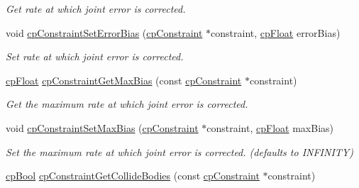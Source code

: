 \begin{DoxyCompactItemize}
\begin{DoxyCompactList}\small\item\em Get rate at which joint error is corrected. \end{DoxyCompactList}\item 
void \hyperlink{group__cp_constraint_ga0cc61db3a9c8d7d5b5b86cfb291f8e4a}{cp\+Constraint\+Set\+Error\+Bias} (\hyperlink{structcp_constraint}{cp\+Constraint} $\ast$constraint, \hyperlink{group__basic_types_gac1ed65573e035bf892505768c852d8d3}{cp\+Float} error\+Bias)
\begin{DoxyCompactList}\small\item\em Set rate at which joint error is corrected. \end{DoxyCompactList}\item 
\hypertarget{group__cp_constraint_ga59463cb910c59fb04102107795ca8c01}{}\hyperlink{group__basic_types_gac1ed65573e035bf892505768c852d8d3}{cp\+Float} \hyperlink{group__cp_constraint_ga59463cb910c59fb04102107795ca8c01}{cp\+Constraint\+Get\+Max\+Bias} (const \hyperlink{structcp_constraint}{cp\+Constraint} $\ast$constraint)\label{group__cp_constraint_ga59463cb910c59fb04102107795ca8c01}

\begin{DoxyCompactList}\small\item\em Get the maximum rate at which joint error is corrected. \end{DoxyCompactList}\item 
\hypertarget{group__cp_constraint_ga32234cacff6f51d15b34ac418f196066}{}void \hyperlink{group__cp_constraint_ga32234cacff6f51d15b34ac418f196066}{cp\+Constraint\+Set\+Max\+Bias} (\hyperlink{structcp_constraint}{cp\+Constraint} $\ast$constraint, \hyperlink{group__basic_types_gac1ed65573e035bf892505768c852d8d3}{cp\+Float} max\+Bias)\label{group__cp_constraint_ga32234cacff6f51d15b34ac418f196066}

\begin{DoxyCompactList}\small\item\em Set the maximum rate at which joint error is corrected. (defaults to I\+N\+F\+I\+N\+I\+T\+Y) \end{DoxyCompactList}\item 
\hypertarget{group__cp_constraint_gad6b565b8818eb48f2b1616b5d6035fac}{}\hyperlink{group__basic_types_gabc5e752c48f3449ca26ef413ecbd647e}{cp\+Bool} \hyperlink{group__cp_constraint_gad6b565b8818eb48f2b1616b5d6035fac}{cp\+Constraint\+Get\+Collide\+Bodies} (const \hyperlink{structcp_constraint}{cp\+Constraint} $\ast$constraint)\label{group__cp_constraint_gad6b565b8818eb48f2b1616b5d6035fac}


\end{DoxyCompactItemize}
